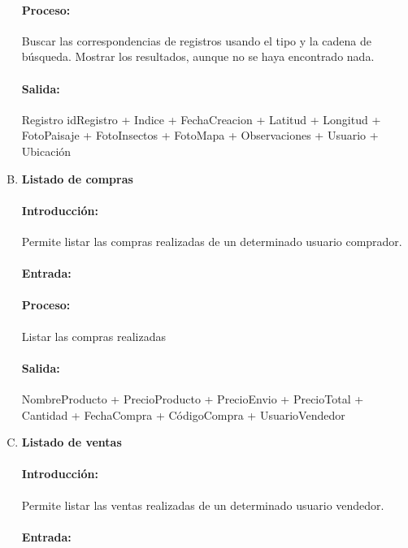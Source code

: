\begin{enumerate}[A.]
        \paragraph{Proceso:} Buscar las correspondencias de registros usando el tipo y la cadena de búsqueda. Mostrar los resultados, aunque no se haya encontrado nada.
        
        \paragraph{Salida:} Registro {idRegistro + Indice + FechaCreacion + Latitud + Longitud + FotoPaisaje + FotoInsectos + FotoMapa + Observaciones + Usuario + Ubicación }
        
        \item \textbf{Listado de compras}
        
        \paragraph{Introducción:} Permite listar las compras realizadas de un determinado usuario comprador.
        
        
        \paragraph{Entrada:} 
        
        \paragraph{Proceso:} Listar las compras realizadas
        
        \paragraph{Salida:} {NombreProducto + PrecioProducto + PrecioEnvio + PrecioTotal + Cantidad + FechaCompra + CódigoCompra + UsuarioVendedor}
        
         \item \textbf{Listado de ventas}
        
        \paragraph{Introducción:} Permite listar las ventas realizadas de un determinado usuario vendedor.
        
        \paragraph{Entrada:}
        

\end{enumerate}

